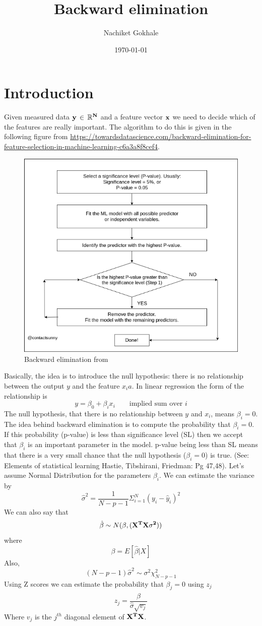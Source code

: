 \documentclass{article}
\newcommand{\beq}{\begin{equation}}
\newcommand{\eeq}{\end{equation}}
\begin{document}
\title{Backward elimination}
\author{Nachiket Gokhale}
\date{\today}
\maketitle
\section{Introduction}
Given measured data {$\bf{y}\,\in\,\mathbb{R}^N$} and a feature vector {$\bf{x}$} we need to decide which of the features are really important. The algorithm to do this is given in the following figure from \url{https://towardsdatascience.com/backward-elimination-for-feature-selection-in-machine-learning-c6a3a8f8cef4}.
\begin{figure}
  \centering
  \includegraphics[totalheight=5cm]{images/backelim.png}
  \caption{Backward elimination from }
\end{figure}
Basically, the idea is to introduce the null hypothesis: there is no relationship between the output $y$ and the feature $x_ia$. In linear regression the form of the relationship is
\beq
y = \beta_0 + \beta_ix_i  \qquad \text{implied sum over } i
\eeq
The null hypothesis, that there is no relationship between $y$ and $x_i$, means $\beta_i=0$. The idea behind backward elimination is to compute the probability that $\beta_i=0$. If this probability (p-value) is less than significance level (SL) then we accept that $\beta_i$ is an important parameter in the model. p-value being less than SL means that there is a very small chance that the null hypothesis ($\beta_i = 0$) is true. (See: Elements of statistical learning Hastie, Tibshirani, Friedman: Pg 47,48). Let's assume Normal Distribution for the parameters $\beta_i$. We can estimate the variance by
\beq
\hat{\sigma}^2 = \frac{1}{N-p-1}\Sigma_{i=1}^{N}(y_i - \hat{y}_i)^2
\eeq
We can also say that
\beq
\hat{\beta} \sim N(\beta,(\bf{X}^T\bf{X}\sigma^2))
\eeq
where
\beq
\beta = E[\hat{\beta}|X]
\eeq
Also,
\beq
(N-p-1)\hat{\sigma}^2 \sim \sigma^2\chi^2_{N-p-1}
\eeq
Using Z scores we can estimate the probability that $\beta_j=0$ using $z_j$
\beq
z_j = \frac{\hat{\beta}}{\hat{\sigma}\sqrt{v_j}}
\eeq
Where $v_j$ is the $j^{th}$ diagonal element of $\bf{X}^T\bf{X}$.
\end{document}
